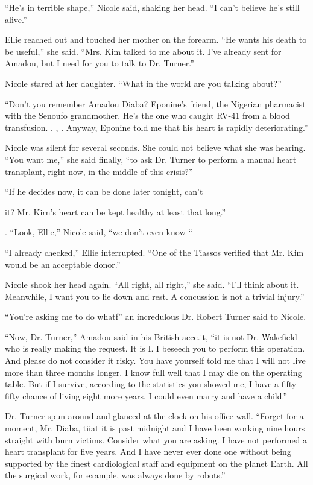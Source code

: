 \documentclass[]{article}
\begin{document}
{“He’s in terrible shape,” Nicole said, shaking her head. “I can’t believe he’s still alive.”

Ellie reached out and touched her mother on the forearm. “He wants his death to be useful,” she said. “Mrs. Kim talked to me about it. I’ve already sent for Amadou, but I need for you to talk to Dr. Turner.”

Nicole stared at her daughter. “What in the world are you talking about?”

“Don’t you remember Amadou Diaba? Eponine’s friend, the Nigerian pharmacist with the Senoufo grandmother. He’s the one who caught RV-41 from a blood transfusion. . , . Anyway, Eponine told me that his heart is rapidly deteriorating.”

Nicole was silent for several seconds. She could not believe what she was hearing. “You want me,” she said finally, “to ask Dr. Turner to perform a manual heart transplant, right now, in the middle of this crisis?”

“If he decides now, it can be done later tonight, can’t

it? Mr. Kirn’s heart can be kept healthy at least that long.”

. “Look, Ellie,” Nicole said, “we don’t even know-“

“I already checked,” Ellie interrupted. “One of the Tiassos verified that Mr. Kim would be an acceptable donor.”

Nicole shook her head again. “All right, all right,” she said. “I’ll think about it. Meanwhile, I want you to lie down and rest. A concussion is not a trivial injury.”

“You’re asking me to do whatf” an incredulous Dr. Robert Turner said to Nicole.

“Now, Dr. Turner,” Amadou said in his British acce.it, “it is not Dr. Wakefield who is really making the request. It is I. I beseech you to perform this operation. And please do not consider it risky. You have yourself told me that I will not live more than three months longer. I know full well that I may die on the operating table. But if I survive, according to the statistics you showed me, I have a fifty-fifty chance of living eight more years. I could even marry and have a child.”

Dr. Turner spun around and glanced at the clock on his office wall. “Forget for a moment, Mr. Diaba, tiiat it is past midnight and I have been working nine hours straight with burn victims. Consider what you are asking. I have not performed a heart transplant for five years. And I have never ever done one without being supported by the finest cardiological staff and equipment on the planet Earth. All the surgical work, for example, was always done by robots.”

}
\end{document}
